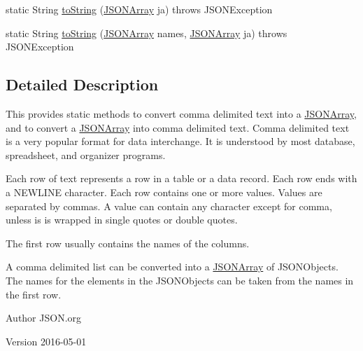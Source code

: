 \begin{DoxyCompactItemize}
\item 
static String \hyperlink{classorg_1_1json_1_1CDL_a4a90929f59ce156378c84830d5f341ad}{to\-String} (\hyperlink{classorg_1_1json_1_1JSONArray}{J\-S\-O\-N\-Array} ja)  throws J\-S\-O\-N\-Exception 
\item 
static String \hyperlink{classorg_1_1json_1_1CDL_a85fc54efa24cb7dad1f615b1d659772f}{to\-String} (\hyperlink{classorg_1_1json_1_1JSONArray}{J\-S\-O\-N\-Array} names, \hyperlink{classorg_1_1json_1_1JSONArray}{J\-S\-O\-N\-Array} ja)  throws J\-S\-O\-N\-Exception 
\end{DoxyCompactItemize}


\subsection{Detailed Description}
This provides static methods to convert comma delimited text into a \hyperlink{classorg_1_1json_1_1JSONArray}{J\-S\-O\-N\-Array}, and to convert a \hyperlink{classorg_1_1json_1_1JSONArray}{J\-S\-O\-N\-Array} into comma delimited text. Comma delimited text is a very popular format for data interchange. It is understood by most database, spreadsheet, and organizer programs. 

Each row of text represents a row in a table or a data record. Each row ends with a N\-E\-W\-L\-I\-N\-E character. Each row contains one or more values. Values are separated by commas. A value can contain any character except for comma, unless is is wrapped in single quotes or double quotes. 

The first row usually contains the names of the columns. 

A comma delimited list can be converted into a \hyperlink{classorg_1_1json_1_1JSONArray}{J\-S\-O\-N\-Array} of J\-S\-O\-N\-Objects. The names for the elements in the J\-S\-O\-N\-Objects can be taken from the names in the first row. \begin{DoxyAuthor}{Author}
J\-S\-O\-N.\-org 
\end{DoxyAuthor}
\begin{DoxyVersion}{Version}
2016-\/05-\/01 
\end{DoxyVersion}


